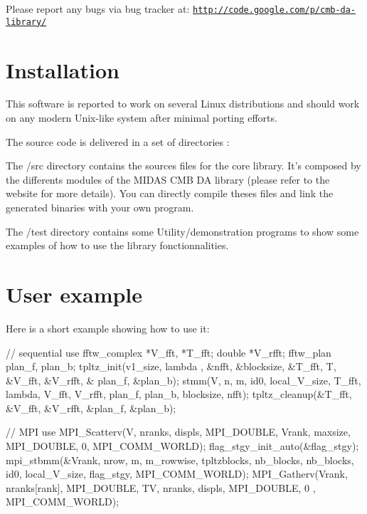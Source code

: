 Please report any bugs via bug tracker at\-: \href{http://code.google.com/p/cmb-da-library/}{\tt http\-://code.\-google.\-com/p/cmb-\/da-\/library/} \section{Installation}\label{toeplitz_install}
This software is reported to work on several Linux distributions and should work on any modern Unix-\/like system after minimal porting efforts.

The source code is delivered in a set of directories \-:


\begin{DoxyItemize}
\item The /src directory contains the sources files for the core library. It's composed by the differents modules of the M\-I\-D\-A\-S C\-M\-B D\-A library (please refer to the website for more details). You can directly compile theses files and link the generated binaries with your own program.
\end{DoxyItemize}


\begin{DoxyItemize}
\item The /test directory contains some Utility/demonstration programs to show some examples of how to use the library fonctionnalities. 
\end{DoxyItemize}\section{User example}\label{toeplitz_example}
Here is a short example showing how to use it\-: 
\begin{DoxyCode}
 \textcolor{comment}{// sequential use}
 fftw\_complex *V\_fft, *T\_fft;
 \textcolor{keywordtype}{double} *V\_rfft;
 fftw\_plan plan\_f, plan\_b;
 tpltz_init(v1\_size, lambda , &nfft, &blocksize, &T\_fft, T, &V\_fft, &V\_rfft, &
      plan\_f, &plan\_b);
 stmm(V, n, m, id0, local\_V\_size, T\_fft, lambda, V\_fft, V\_rfft, plan\_f, plan\_b,
       blocksize, nfft);
 tpltz_cleanup(&T\_fft, &V\_fft, &V\_rfft, &plan\_f, &plan\_b);
\end{DoxyCode}
 
\begin{DoxyCode}
 \textcolor{comment}{// MPI use}
 MPI\_Scatterv(V, nranks, displs, MPI\_DOUBLE, Vrank, maxsize, MPI\_DOUBLE, 0, 
      MPI\_COMM\_WORLD); 
 flag_stgy_init_auto(&flag\_stgy);
 mpi_stbmm(&Vrank, nrow, m, m\_rowwise, tpltzblocks, nb\_blocks, nb\_blocks, id0, 
      local\_V\_size, flag\_stgy, MPI\_COMM\_WORLD);
 MPI\_Gatherv(Vrank, nranks[rank], MPI\_DOUBLE, TV, nranks, displs, MPI\_DOUBLE, 0
      , MPI\_COMM\_WORLD);
\end{DoxyCode}
 